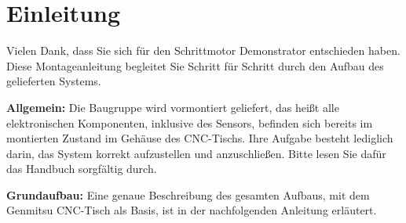%
%

\chapter{Einleitung}

Vielen Dank, dass Sie sich für den Schrittmotor Demonstrator entschieden haben.
Diese Montageanleitung begleitet Sie Schritt für Schritt durch den Aufbau
des gelieferten Systems.

\vspace{0.5cm}
\textbf{Allgemein:}
	Die Baugruppe wird vormontiert geliefert, das heißt alle
	elektronischen Komponenten, inklusive des Sensors, befinden sich bereits im montierten
	Zustand im Gehäuse des CNC-Tischs. Ihre Aufgabe besteht lediglich darin,
	das System korrekt aufzustellen und anzuschließen.
	Bitte lesen Sie dafür das Handbuch sorgfältig durch.

\vspace{0.5cm}
\textbf{Grundaufbau:}
Eine genaue Beschreibung des gesamten Aufbaus, mit dem Genmitsu CNC-Tisch als Basis, ist in der nachfolgenden Anleitung erläutert.


	\vspace{2cm}
	
	
	
	